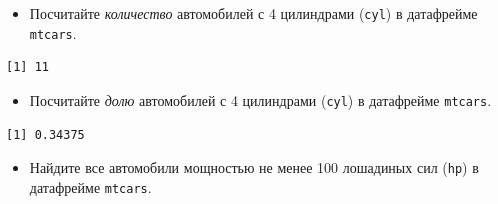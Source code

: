 \documentclass[
]{book}
\newenvironment{Shaded}{\begin{snugshade}}{\end{snugshade}}
\newcommand{\DecValTok}[1]{\textcolor[rgb]{0.00,0.00,0.81}{#1}}
\newcommand{\KeywordTok}[1]{\textcolor[rgb]{0.13,0.29,0.53}{\textbf{#1}}}
\newcommand{\NormalTok}[1]{#1}
\newcommand{\OperatorTok}[1]{\textcolor[rgb]{0.81,0.36,0.00}{\textbf{#1}}}
\newcommand{\StringTok}[1]{\textcolor[rgb]{0.31,0.60,0.02}{#1}}
\providecommand{\tightlist}{%
  \setlength{\itemsep}{0pt}\setlength{\parskip}{0pt}}
\begin{document}
\begin{itemize}
\tightlist
\item
  Посчитайте \emph{количество} автомобилей с 4 цилиндрами (\texttt{cyl}) в датафрейме \texttt{mtcars}.
\end{itemize}

\begin{Shaded}
\end{Shaded}

\begin{verbatim}
[1] 11
\end{verbatim}

\begin{itemize}
\tightlist
\item
  Посчитайте \emph{долю} автомобилей с 4 цилиндрами (\texttt{cyl}) в датафрейме \texttt{mtcars}.
\end{itemize}

\begin{Shaded}
\end{Shaded}

\begin{verbatim}
[1] 0.34375
\end{verbatim}

\begin{itemize}
\tightlist
\item
  Найдите все автомобили мощностью не менее 100 лошадиных сил (\texttt{hp}) в датафрейме \texttt{mtcars}.
\end{itemize}

\begin{Shaded}
\end{Shaded}
\end{document}
